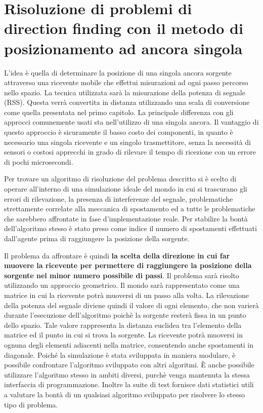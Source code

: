 \section{Risoluzione di problemi di direction finding con il metodo di posizionamento ad ancora singola}
L'idea è quella di determinare la posizione di una singola ancora sorgente attraverso una ricevente mobile che effettui misurazioni ad ogni passo percorso nello spazio. La tecnica utilizzata sarà la misurazione della potenza di segnale (RSS). Questa verrà convertita in distanza utilizzando una scala di conversione come quella presentata nel primo capitolo.
La principale differenza con gli approcci comunemente usati sta nell'utilizzo di una singola ancora. 
Il vantaggio di questo approccio è sicuramente il basso costo dei componenti, in quanto è necessario una singola ricevente e un singolo trasmettitore, senza la necessità di sensori o costosi apprecchi in grado di rilevare il tempo di ricezione con un errore di pochi microsecondi.

Per trovare un algoritmo di risoluzione del problema descritto si è scelto di operare all'interno di una simulazione ideale del mondo in cui si trascurano gli errori di rilevazione, la presenza di interferenze del segnale, problematiche strettamente correlate alla meccanica di spostamento ed a tutte le problematiche che sarebbero affrontate in fase d'implementazione reale. Per stabilire la bontà dell'algoritmo stesso è stato preso come indice il numero di spostamenti effettuati dall'agente prima di raggiungere la posizione della sorgente.

Il problema da affrontare è quindi \textbf{la scelta della direzione in cui far muovere la ricevente per permettere di raggiungere la posizione della sorgente nel minor numero possibile di passi}. Il problema sarà risolto utilizzando un approccio geometrico. Il mondo sarà rappresentato come una matrice in cui la ricevente potrà muoversi di un passo alla volta. La rilevazione della potenza del segnale diviene quindi il valore di ogni elemento, che non varierà durante l'esecuzione dell'algoritmo poichè la sorgente resterà fissa in un punto dello spazio. Tale valore rappresenta la distanza euclidea tra l'elemento della matrice ed il punto in cui si trova la sorgente. La ricevente potrà muoversi in ognuna degli elementi adiacenti nella matrice, consentendo anche spostamenti in diagonale. Poiché la simulazione è stata sviluppata in maniera modulare, è possibile confrontare l'algoritmo sviluppato con altri algoritmi. È anche possibile utilizzare l'algoritmo stesso in ambiti diversi, purchè venga mantenuta la stessa interfaccia di programmazione. Inoltre la suite di test fornisce dati statistici utili a valutare la bontà di un qualsiasi algoritmo sviluppato per risolvere lo stesso tipo di problema. 

